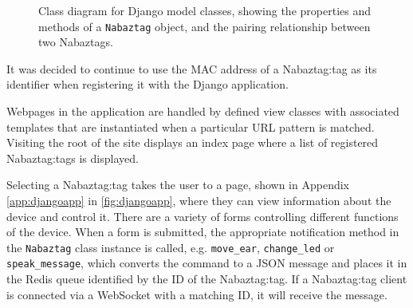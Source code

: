 \documentclass[12pt, a4paper]{article}
\begin{document}
	\begin{figure}[H]
	\centering
	\scriptsize
	\caption[Class diagram for Django model classes]{Class diagram for Django model classes, showing the properties and methods of a \texttt{Nabaztag} object, and the pairing relationship between two Nabaztags.}
	\label{fig:djangoclassdiagram}
	\end{figure}
	
	\vspace{-15pt}
	
	It was decided to continue to use the \ac{MAC} address of a Nabaztag:tag as its identifier when registering it with the Django application.
	
	Webpages in the application are handled by defined view classes with associated templates that are instantiated when a particular \ac{URL} pattern is matched. Visiting the root of the site displays an index page where a list of registered Nabaztag:tags is displayed.

	Selecting a Nabaztag:tag takes the user to a page, shown in Appendix \ref{app:djangoapp} in \autoref{fig:djangoapp}, where they can view information about the device and control it. There are a variety of forms controlling different functions of the device. When a form is submitted, the appropriate notification method in the \verb+Nabaztag+ class instance is called, e.g. \verb+move_ear+, \verb+change_led+ or \verb+speak_message+, which converts the command to a \ac{JSON} message and places it in the Redis queue identified by the ID of the Nabaztag:tag. If a Nabaztag:tag client is connected via a WebSocket with a matching ID, it will receive the message.
	
\end{document}
